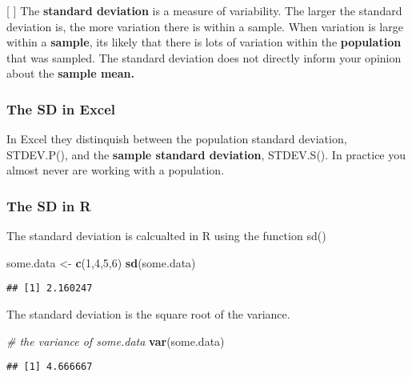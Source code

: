 \documentclass[]{book}
\newenvironment{Shaded}{\begin{snugshade}}{\end{snugshade}}
\newcommand{\KeywordTok}[1]{\textcolor[rgb]{0.13,0.29,0.53}{\textbf{#1}}}
\newcommand{\DecValTok}[1]{\textcolor[rgb]{0.00,0.00,0.81}{#1}}
\newcommand{\StringTok}[1]{\textcolor[rgb]{0.31,0.60,0.02}{#1}}
\newcommand{\CommentTok}[1]{\textcolor[rgb]{0.56,0.35,0.01}{\textit{#1}}}
\newcommand{\NormalTok}[1]{#1}
\theoremstyle{definition}
\theoremstyle{definition}
\theoremstyle{definition}
\theoremstyle{remark}
\begin{document}
{[} {]} The \textbf{standard deviation} is a measure of variability. The
larger the standard deviation is, the more variation there is within a
sample. When variation is large within a \textbf{sample}, its likely
that there is lots of variation within the \textbf{population} that was
sampled. The standard deviation does not directly inform your opinion
about the \textbf{sample mean.}

\subsubsection*{The SD in Excel}\label{the-sd-in-excel}

In Excel they distinquish between the population standard deviation,
STDEV.P(), and the \textbf{sample standard deviation}, STDEV.S(). In
practice you almost never are working with a population.

\subsubsection*{The SD in R}\label{the-sd-in-r}

The standard deviation is calcualted in R using the function sd()

\begin{Shaded}
\begin{Highlighting}[]
\NormalTok{some.data <-}\StringTok{ }\KeywordTok{c}\NormalTok{(}\DecValTok{1}\NormalTok{,}\DecValTok{4}\NormalTok{,}\DecValTok{5}\NormalTok{,}\DecValTok{6}\NormalTok{)}
\KeywordTok{sd}\NormalTok{(some.data)}
\end{Highlighting}
\end{Shaded}

\begin{verbatim}
## [1] 2.160247
\end{verbatim}

The standard deviation is the square root of the variance.

\begin{Shaded}
\begin{Highlighting}[]
\CommentTok{# the variance of some.data}
\KeywordTok{var}\NormalTok{(some.data)}
\end{Highlighting}
\end{Shaded}

\begin{verbatim}
## [1] 4.666667
\end{verbatim}
\end{document}
